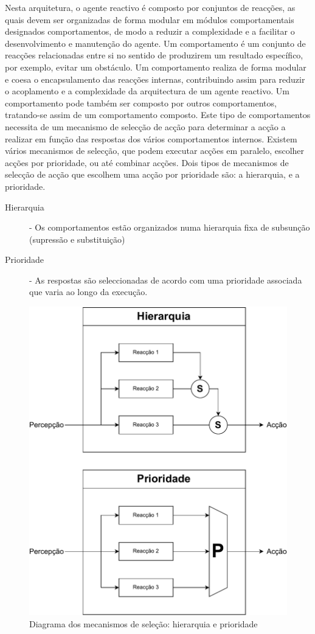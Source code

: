 \documentclass[a4paper,12pt]{article}
\begin{document}
Nesta arquitetura, o agente reactivo é composto por conjuntos de reacções, as quais devem ser organizadas de forma modular em módulos comportamentais designados comportamentos, de modo a reduzir a complexidade e a facilitar o desenvolvimento e manutenção do agente. Um comportamento é um conjunto de reacções relacionadas entre si no sentido de produzirem um resultado específico, por exemplo, evitar um obstáculo.  Um comportamento realiza de forma modular e coesa o encapsulamento das reacções internas, contribuindo assim para reduzir o acoplamento e a complexidade da arquitectura de um agente reactivo.
Um comportamento pode também ser composto por outros comportamentos, tratando-se assim de um comportamento composto. Este tipo de comportamentos necessita de um mecanismo de selecção de acção para determinar a acção a realizar em função das respostas dos vários comportamentos internos.
Existem vários mecanismos de selecção, que podem executar acções em paralelo, escolher acções por prioridade, ou até combinar acções. Dois tipos de mecanismos de selecção de acção que escolhem uma acção por prioridade são: a hierarquia, e a prioridade.

\begin{description}
	\item[Hierarquia] - Os comportamentos estão organizados numa hierarquia fixa de subsunção (supressão e substituição)
	\item[Prioridade] - As respostas são seleccionadas de acordo com uma prioridade associada que varia ao longo da execução.
\end{description}

\begin{figure}[h]
\centering
\includegraphics[scale=0.5]{mecanismosselecao}
\caption{Diagrama dos mecanismos de seleção: hierarquia e prioridade}
\end{figure}
\end{document}
